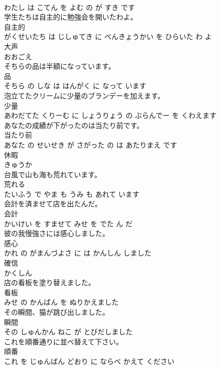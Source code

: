 \documentclass[8pt]{extreport}
\begin{document}
\begin{CJK}{UTF8}{min}
\\	わたし は こてん を よむ の が すき です			
\\	学生たちは自主的に勉強会を開いたわよ。	
\\	自主的 
\\	がくせいたち は じしゅてき に べんきょうかい を ひらいた わ よ			
\\	大声	
\\	おおごえ			
\\	そちらの品は半額になっています。	
\\	品 
\\	そちら の しな は はんがく に なって います			
\\	泡立てたクリームに少量のブランデーを加えます。	
\\	少量 
\\	あわだてた くりーむ に しょうりょう の ぶらんでー を くわえます			
\\	あなたの成績が下がったのは当たり前です。	
\\	当たり前 
\\	あなた の せいせき が さがった の は あたりまえ です			
\\	休暇	
\\	きゅうか			
\\	台風で山も海も荒れています。	
\\	荒れる 
\\	たいふう で やま も うみ も あれて います			
\\	会計を済ませて店を出たんだ。	
\\	会計 
\\	かいけい を すませて みせ を でた ん だ			
\\	彼の我慢強さには感心しました。	
\\	感心 
\\	かれ の がまんづよさ に は かんしん しました			
\\	確信	
\\	かくしん			
\\	店の看板を塗り替えました。	
\\	看板 
\\	みせ の かんばん を ぬりかえました			
\\	その瞬間、猫が跳び出しました。	
\\	瞬間 
\\	その しゅんかん ねこ が とびだしました			
\\	これを順番通りに並べ替えて下さい。	
\\	順番 
\\	これ を じゅんばん どおり に ならべ かえて ください			

\end{CJK}
\end{document}
